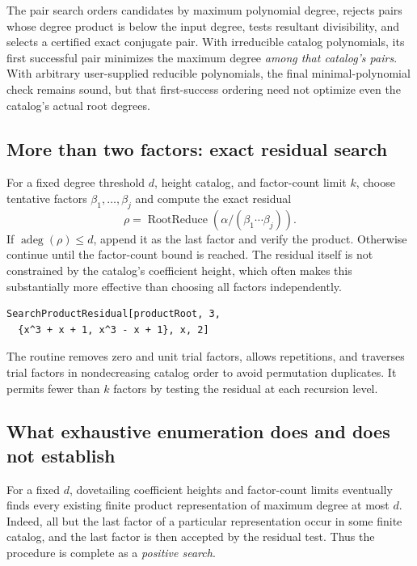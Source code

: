 \documentclass[11pt,letterpaper]{article}
\theoremstyle{definition}\newtheorem{definition}[theorem]{Definition}
\theoremstyle{remark}\newtheorem{remark}[theorem]{Remark}
\newcommand{\ad}{\operatorname{adeg}}
\begin{document}
The pair search orders candidates by maximum polynomial degree, rejects pairs whose degree product is below the input degree, tests resultant divisibility, and selects a certified exact conjugate pair. With irreducible catalog polynomials, its first successful pair minimizes the maximum degree \emph{among that catalog's pairs}. With arbitrary user-supplied reducible polynomials, the final minimal-polynomial check remains sound, but that first-success ordering need not optimize even the catalog's actual root degrees.

\subsection{More than two factors: exact residual search}
For a fixed degree threshold $d$, height catalog, and factor-count limit $k$, choose tentative factors $\beta_1,\ldots,\beta_j$ and compute the exact residual
\begin{equation}
 \rho=\operatorname{RootReduce}\left(\alpha/(\beta_1\cdots\beta_j)\right).
 \label{eq:residual}
\end{equation}
If $\ad(\rho)\le d$, append it as the last factor and verify the product. Otherwise continue until the factor-count bound is reached. The residual itself is not constrained by the catalog's coefficient height, which often makes this substantially more effective than choosing all factors independently.

\begin{lstlisting}
SearchProductResidual[productRoot, 3,
  {x^3 + x + 1, x^3 - x + 1}, x, 2]
\end{lstlisting}
The routine removes zero and unit trial factors, allows repetitions, and traverses trial factors in nondecreasing catalog order to avoid permutation duplicates. It permits fewer than $k$ factors by testing the residual at each recursion level.

\subsection{What exhaustive enumeration does and does not establish}
For a fixed $d$, dovetailing coefficient heights and factor-count limits eventually finds every existing finite product representation of maximum degree at most $d$. Indeed, all but the last factor of a particular representation occur in some finite catalog, and the last factor is then accepted by the residual test. Thus the procedure is complete as a \emph{positive search}.
\end{document}
